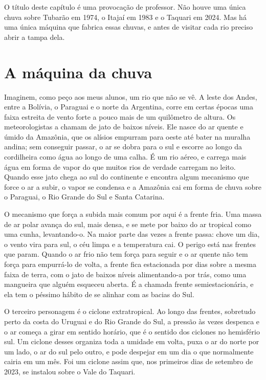 \documentclass[
  brazilian,
  11pt,
  openany]{book}
\begin{document}
O título deste capítulo é uma provocação de professor. Não houve uma
única chuva sobre Tubarão em 1974, o Itajaí em 1983 e o Taquari em 2024.
Mas há uma única máquina que fabrica essas chuvas, e antes de visitar
cada rio preciso abrir a tampa dela.

\section{A máquina da chuva}\label{a-muxe1quina-da-chuva}

Imaginem, como peço aos meus alunos, um rio que não se vê. A leste dos
Andes, entre a Bolívia, o Paraguai e o norte da Argentina, corre em
certas épocas uma faixa estreita de vento forte a pouco mais de um
quilômetro de altura. Os meteorologistas a chamam de jato de baixos
níveis. Ele nasce do ar quente e úmido da Amazônia, que os alísios
empurram para oeste até bater na muralha andina; sem conseguir passar, o
ar se dobra para o sul e escorre ao longo da cordilheira como água ao
longo de uma calha. É um rio aéreo, e carrega mais água em forma de
vapor do que muitos rios de verdade carregam no leito. Quando esse jato
chega ao sul do continente e encontra algum mecanismo que force o ar a
subir, o vapor se condensa e a Amazônia cai em forma de chuva sobre o
Paraguai, o Rio Grande do Sul e Santa Catarina.

O mecanismo que força a subida mais comum por aqui é a frente fria. Uma
massa de ar polar avança do sul, mais densa, e se mete por baixo do ar
tropical como uma cunha, levantando-o. Na maior parte das vezes a frente
passa: chove um dia, o vento vira para sul, o céu limpa e a temperatura
cai. O perigo está nas frentes que param. Quando o ar frio não tem força
para seguir e o ar quente não tem força para empurrá-lo de volta, a
frente fica estacionada por dias sobre a mesma faixa de terra, com o
jato de baixos níveis alimentando-a por trás, como uma mangueira que
alguém esqueceu aberta. É a chamada frente semiestacionária, e ela tem o
péssimo hábito de se alinhar com as bacias do Sul.

O terceiro personagem é o ciclone extratropical. Ao longo das frentes,
sobretudo perto da costa do Uruguai e do Rio Grande do Sul, a pressão às
vezes despenca e o ar começa a girar em sentido horário, que é o sentido
dos ciclones no hemisfério sul. Um ciclone desses organiza toda a
umidade em volta, puxa o ar do norte por um lado, o ar do sul pelo
outro, e pode despejar em um dia o que normalmente cairia em um mês. Foi
um ciclone assim que, nos primeiros dias de setembro de 2023, se
instalou sobre o Vale do Taquari.
\end{document}
